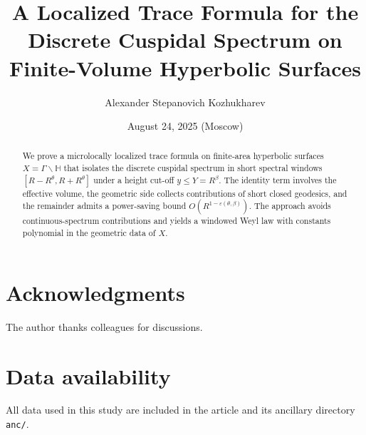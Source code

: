 \documentclass[12pt]{amsart}
\title[Localized Trace Formula]{A Localized Trace Formula for the Discrete Cuspidal Spectrum on Finite-Volume Hyperbolic Surfaces}
\author{Alexander Stepanovich Kozhukharev}
\date{August 24, 2025 (Moscow)}
\numberwithin{equation}{section}
\theoremstyle{plain}
\theoremstyle{definition}
\theoremstyle{remark}
\newcommand{\HH}{\mathbb{H}}
\begin{document}
\begin{abstract}
We prove a microlocally localized trace formula on finite-area hyperbolic surfaces $X=\Gamma\backslash\HH$ that isolates the discrete cuspidal spectrum in short spectral windows $[R-R^\theta,R+R^\theta]$ under a height cut-off $y\le Y=R^\beta$. The identity term involves the effective volume, the geometric side collects contributions of short closed geodesics, and the remainder admits a power-saving bound $O(R^{1-\varepsilon(\theta,\beta)})$. The approach avoids continuous-spectrum contributions and yields a windowed Weyl law with constants polynomial in the geometric data of $X$.
\end{abstract}

\maketitle
\tableofcontents










\section*{Acknowledgments}
The author thanks colleagues for discussions.

\section*{Data availability}
All data used in this study are included in the article and its ancillary directory \texttt{anc/}.




\appendix


\end{document}
